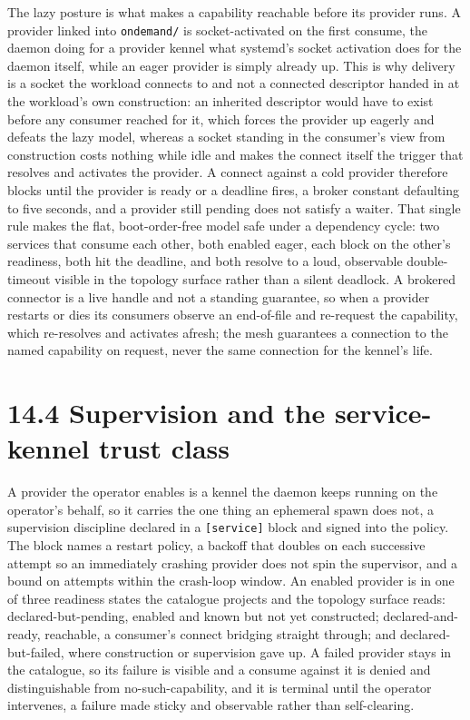 The lazy posture is what makes a capability reachable before its
provider runs. A provider linked into \texttt{ondemand/} is
socket-activated on the first consume, the daemon doing for a provider
kennel what systemd's socket activation does for the daemon itself,
while an eager provider is simply already up. This is why delivery is a
socket the workload connects to and not a connected descriptor handed in
at the workload's own construction: an inherited descriptor would have
to exist before any consumer reached for it, which forces the provider
up eagerly and defeats the lazy model, whereas a socket standing in the
consumer's view from construction costs nothing while idle and makes the
connect itself the trigger that resolves and activates the provider. A
connect against a cold provider therefore blocks until the provider is
ready or a deadline fires, a broker constant defaulting to five seconds,
and a provider still pending does not satisfy a waiter. That single rule
makes the flat, boot-order-free model safe under a dependency cycle: two
services that consume each other, both enabled eager, each block on the
other's readiness, both hit the deadline, and both resolve to a loud,
observable double-timeout visible in the topology surface rather than a
silent deadlock. A brokered connector is a live handle and not a
standing guarantee, so when a provider restarts or dies its consumers
observe an end-of-file and re-request the capability, which re-resolves
and activates afresh; the mesh guarantees a connection to the named
capability on request, never the same connection for the kennel's life.

\hypertarget{supervision-and-the-service-kennel-trust-class}{%
\section{14.4 Supervision and the service-kennel trust
class}\label{supervision-and-the-service-kennel-trust-class}}

A provider the operator enables is a kennel the daemon keeps running on
the operator's behalf, so it carries the one thing an ephemeral spawn
does not, a supervision discipline declared in a \texttt{{[}service{]}}
block and signed into the policy. The block names a restart policy, a
backoff that doubles on each successive attempt so an immediately
crashing provider does not spin the supervisor, and a bound on attempts
within the crash-loop window. An enabled provider is in one of three
readiness states the catalogue projects and the topology surface reads:
declared-but-pending, enabled and known but not yet constructed;
declared-and-ready, reachable, a consumer's connect bridging straight
through; and declared-but-failed, where construction or supervision gave
up. A failed provider stays in the catalogue, so its failure is visible
and a consume against it is denied and distinguishable from
no-such-capability, and it is terminal until the operator intervenes, a
failure made sticky and observable rather than self-clearing.

